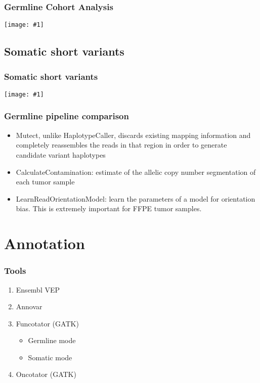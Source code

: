 \documentclass{beamer}
\newcommand {\framedgraphic}[1] {
\begin{center}
\texttt{[image: \#1]}
\end{center}
}
\begin{document}
\begin{frame}
\frametitle{Germline Cohort Analysis}
\framedgraphic{cohort_pipeline.png}
\end{frame}

\subsection{Somatic short variants}

\begin{frame}
\frametitle{Somatic short variants}
\framedgraphic{somatic_pipeline.png}
\end{frame}

\begin{frame}
\frametitle{Germline pipeline comparison}
\begin{itemize}
 \item Mutect, unlike HaplotypeCaller, discards existing mapping information and completely reassembles the reads in that region in order to generate candidate variant haplotypes
 \item CalculateContamination: estimate of the allelic copy number segmentation of each tumor sample
 \item LearnReadOrientationModel: learn the parameters of a model for orientation bias. This is extremely important for FFPE tumor samples.
\end{itemize}

\end{frame}

\section{Annotation}

\begin{frame}
\frametitle{Tools}

\begin{enumerate}
\item Ensembl VEP
\item Annovar
\item Funcotator (GATK)
\begin{itemize}
\item Germline mode
\item Somatic mode
\end{itemize}
\item Oncotator (GATK)
\end{enumerate}

\end{frame}
\end{document}

